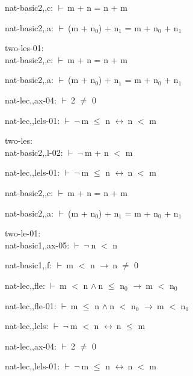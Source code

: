 \documentclass[a4paper]{article}
\newcommand{\Fol}{\mbox{$\vdash\ $}}
\newcommand{\Not}{\mbox{$\neg\ $}}
\newcommand{\And}{\mbox{$\wedge\ $}}
\newcommand{\Imp}{\mbox{$\rightarrow\ $}}
\newcommand{\Equiv}{\mbox{$\leftrightarrow\ $}}
\begin{document}
nat-basic2,,c: 
 \Fol m + n = n + m



nat-basic2,,a: 
 \Fol (m + $\mbox{n}_{0}$) + $\mbox{n}_{1}$ = m + $\mbox{n}_{0}$ + $\mbox{n}_{1}$



\bigskip

two-les-01:\\ nat-basic2,,c: 
 \Fol m + n = n + m



nat-basic2,,a: 
 \Fol (m + $\mbox{n}_{0}$) + $\mbox{n}_{1}$ = m + $\mbox{n}_{0}$ + $\mbox{n}_{1}$



nat-lec,,ax-04: 
 \Fol 2 $\neq$ 0



nat-lec,,lels-01: 
 \Fol \Not m $\le$ n \Equiv n $<$ m



\bigskip

two-les:\\ nat-basic2,,l-02: 
 \Fol \Not m + n $<$ m



nat-lec,,lels-01: 
 \Fol \Not m $\le$ n \Equiv n $<$ m



nat-basic2,,c: 
 \Fol m + n = n + m



nat-basic2,,a: 
 \Fol (m + $\mbox{n}_{0}$) + $\mbox{n}_{1}$ = m + $\mbox{n}_{0}$ + $\mbox{n}_{1}$



\bigskip

two-le-01:\\ nat-basic1,,ax-05: 
 \Fol \Not n $<$ n



nat-basic1,,f: 
 \Fol m $<$ n \Imp n $\neq$ 0



nat-lec,,fle: 
 \Fol m $<$ n \And n $\le$ $\mbox{n}_{0}$ \Imp m $<$ $\mbox{n}_{0}$



nat-lec,,fle-01: 
 \Fol m $\le$ n \And n $<$ $\mbox{n}_{0}$ \Imp m $<$ $\mbox{n}_{0}$



nat-lec,,lels: 
 \Fol \Not m $<$ n \Equiv n $\le$ m



nat-lec,,ax-04: 
 \Fol 2 $\neq$ 0



nat-lec,,lels-01: 
 \Fol \Not m $\le$ n \Equiv n $<$ m
\end{document}
